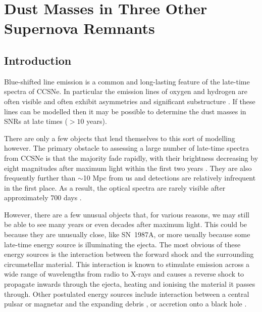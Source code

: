 \chapter[Dust Masses in Three Other Supernova Remnants]{Dust Masses in Three Other \\ Supernova Remnants}\label{chp:chp6}

%
%

\section{Introduction}

Blue-shifted line emission is a common and long-lasting feature of the late-time spectra of CCSNe.  In particular the emission lines of oxygen and hydrogen are often visible and often exhibit asymmetries and significant substructure \citep{Milisavljevic2012}.  If these lines can be modelled then it may be possible to determine the dust masses in SNRs at late times ($>10$ years).

There are only a few objects that lend themselves to this sort of modelling however.  The primary obstacle to assessing a large number of late-time spectra from CCSNe is that the majority fade rapidly,  with their brightness decreasing by eight magnitudes after maximum light within the first two years \citep{Kirshner1990}.  They are also frequently further than $\sim$10 Mpc from us and detections are relatively infrequent in the first place.  As a result, the optical spectra are rarely visible after approximately 700 days \citep{Milisavljevic2012}.  

However, there are a few unusual objects that, for various reasons, we may still be able to see many years or even decades after maximum light.  This could be because they are unusually close, like SN~1987A, or more usually because some late-time energy source is illuminating the ejecta.  The most obvious of these energy sources is the interaction between the forward shock and the surrounding circumstellar material.  This interaction is known to stimulate emission across a wide range of wavelengths from radio to X-rays and causes a reverse shock to propagate inwards through the ejecta, heating and ionising the material it passes through.  Other postulated energy sources include interaction between a central pulsar or magnetar and the expanding debris \citep{Woosley2010}, or accretion onto a black hole \citep{Patnaude2001}.

